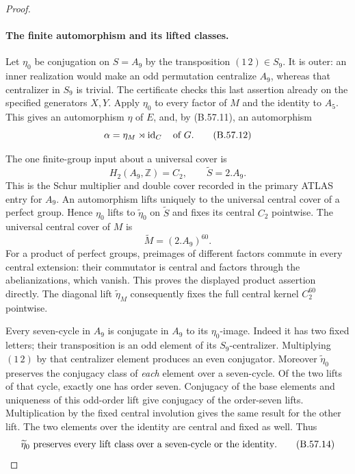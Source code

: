 \begin{proof}
\paragraph{The finite automorphism and its lifted classes.}
Let $\eta_0$ be conjugation on $S=A_9$ by the
transposition $(1\,2)\in S_9$. It is outer: an inner
realization would make an odd permutation centralize
$A_9$, whereas that centralizer in $S_9$ is trivial.
The certificate checks this last assertion already
on the specified generators $X,Y$.
Apply $\eta_0$ to every factor of $M$ and the identity
to $A_5$. This gives an automorphism $\eta$ of $E$,
and, by (B.57.11), an automorphism
\[
                     \alpha=\eta_M\rtimes\operatorname{id}_C
                                     \quad\hbox{of }G.     \tag{B.57.12}
\]

The one finite-group input about a universal cover is
\[
                H_2(A_9,\mathbb Z)=C_2,\qquad
                         \widetilde S=2.A_9.
                                                               \tag{B.57.13}
\]
This is the Schur multiplier and double cover recorded
in the primary ATLAS entry for $A_9$.\cite{CEAtlasA9}
An automorphism lifts uniquely to the universal central
cover of a perfect group. Hence $\eta_0$ lifts to
$\widetilde\eta_0$ on $\widetilde S$ and fixes its central
$C_2$ pointwise. The universal central cover of $M$ is
\[
                       \widetilde M=(2.A_9)^{60}.
\]
For a product of perfect groups, preimages of different
factors commute in every central extension: their
commutator is central and factors through the
abelianizations, which vanish. This proves the
displayed product assertion directly. The diagonal
lift $\widetilde\eta_M$ consequently fixes the full
central kernel $C_2^{60}$ pointwise.

Every seven-cycle in $A_9$ is conjugate in $A_9$ to
its $\eta_0$-image. Indeed it has two fixed letters;
their transposition is an odd element of its
$S_9$-centralizer. Multiplying $(1\,2)$ by that
centralizer element produces an even conjugator.
Moreover $\widetilde\eta_0$ preserves the conjugacy
class of \emph{each} element over a seven-cycle.
Of the two lifts of that cycle, exactly one has
order seven. Conjugacy of the base elements and
uniqueness of this odd-order lift give conjugacy
of the order-seven lifts. Multiplication by the
fixed central involution gives the same result
for the other lift. The two elements over the
identity are central and fixed as well. Thus
\[
 \widetilde\eta_0\hbox{ preserves every lift class
                 over a seven-cycle or the identity}.   \tag{B.57.14}
\]


\end{proof}
